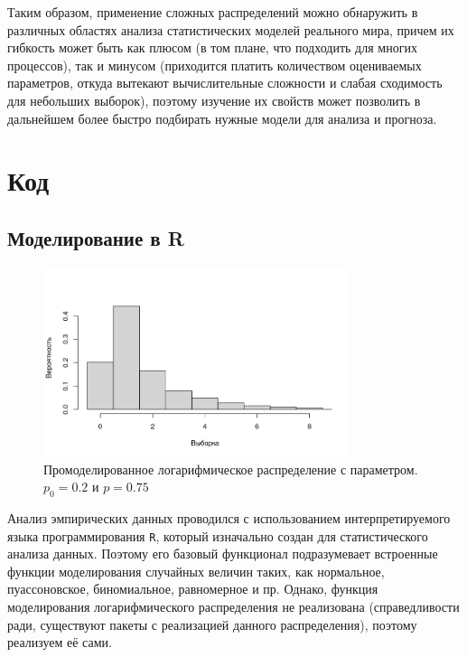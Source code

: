 \documentclass[12pt, specialist, subf, substylefile = spbu.rtx]{disser}
\begin{document}
	Таким образом, применение сложных распределений можно обнаружить в различных областях анализа статистических моделей реального мира, причем их гибкость может быть как плюсом (в том плане, что подходить для многих процессов), так и минусом (приходится платить количеством оцениваемых параметров, откуда вытекают вычислительные сложности и слабая сходимость для небольших выборок), поэтому изучение их свойств может позволить в дальнейшем более быстро подбирать нужные модели для анализа и прогноза.  
	
	
	
	
	\appendix
	
	\chapter{Код}
	
	\section{Моделирование в R}
	
	\begin{figure}[ht]
		\centering
		\includegraphics[width = 0.8\textwidth]{logdistr}
		\caption{Промоделированное логарифмическое распределение с параметром. $ p _0 = 0.2 $ и $ p = 0.75 $}
		\label{img:logdist}
	\end{figure}
	
	Анализ эмпирических данных проводился с использованием интерпретируемого языка программирования \verb|R|, который изначально создан для статистического анализа данных. Поэтому его базовый функционал подразумевает встроенные функции моделирования случайных величин таких, как нормальное, пуассоновское, биномиальное, равномерное и пр. Однако, функция моделирования логарифмического распределения не реализована (справедливости ради, существуют пакеты с реализацией данного распределения), поэтому реализуем её сами.
	
\end{document}
